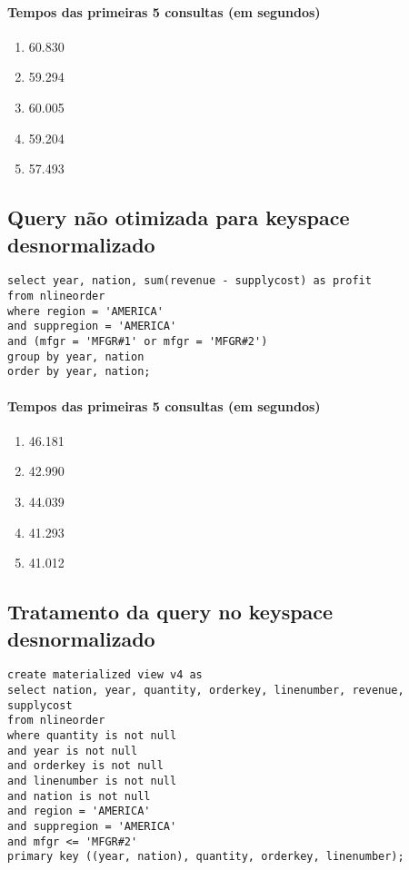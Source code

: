 \documentclass[12pt]{article}
\begin{document}
\paragraph{Tempos das primeiras 5 consultas (em segundos)}
\begin{enumerate}
\item 60.830
\item 59.294
\item 60.005 
\item 59.204 
\item 57.493
\end{enumerate}

\subsection{Query não otimizada para keyspace desnormalizado}

\begin{lstlisting}
select year, nation, sum(revenue - supplycost) as profit 
from nlineorder
where region = 'AMERICA'
and suppregion = 'AMERICA'
and (mfgr = 'MFGR#1' or mfgr = 'MFGR#2')
group by year, nation
order by year, nation;
\end{lstlisting}

\paragraph{Tempos das primeiras 5 consultas (em segundos)}
\begin{enumerate}
\item 46.181
\item 42.990
\item 44.039
\item 41.293
\item 41.012
\end{enumerate}

\subsection{Tratamento da query no keyspace desnormalizado}

\begin{lstlisting}
create materialized view v4 as 
select nation, year, quantity, orderkey, linenumber, revenue, supplycost
from nlineorder
where quantity is not null
and year is not null
and orderkey is not null
and linenumber is not null
and nation is not null
and region = 'AMERICA'
and suppregion = 'AMERICA'
and mfgr <= 'MFGR#2'
primary key ((year, nation), quantity, orderkey, linenumber);
\end{lstlisting}
\end{document}
